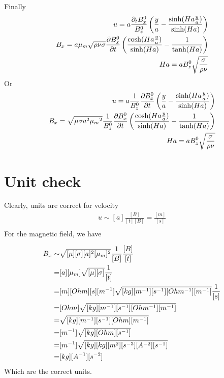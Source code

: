 \documentclass[11pt]{article}
\begin{document}
Finally
\begin{equation}\begin{aligned}
u   = a \frac{\partial_t B_x^0}{ B_z^0} \left( \frac{y}{a} - \frac{\sinh(Ha \frac{y}{a})}{\sinh(Ha)} \right) \\
B_x = a {\mu_m} \sqrt{\rho \nu \sigma}  \frac{\partial B_x^0}{\partial t} \left( \frac{\cosh(Ha \frac{y}{a})}{\sinh(Ha)} - \frac{1}{\tanh(Ha)} \right) \\
Ha = a B_z^0 \sqrt{\frac{\sigma}{\rho \nu}} \\
\end{aligned} \end{equation}
Or
\begin{equation}\begin{aligned}
u   = a \frac{1}{B_z^0} \frac{\partial B_x^0}{\partial t}  \left( \frac{y}{a} - \frac{\sinh(Ha \frac{y}{a})}{\sinh(Ha)} \right) \\
B_x = \sqrt{\mu \sigma a^2 {\mu_m}^2} \frac{1}{B_z^0} \frac{\partial B_x^0}{\partial t} \left( \frac{\cosh(Ha \frac{y}{a})}{\sinh(Ha)} - \frac{1}{\tanh(Ha)} \right) \\
Ha = a B_z^0 \sqrt{\frac{\sigma}{\rho \nu}} \\
\end{aligned} \end{equation}

\section{Unit check}
Clearly, units are correct for velocity
\begin{equation}\begin{aligned}
u  \sim [a] \frac{[B]}{[t] [B]} = \frac{[m]}{[s]} \\
\end{aligned} \end{equation}
For the magnetic field, we have

\begin{equation}\begin{aligned}
B_x \sim & \sqrt{[\mu] [\sigma] [a]^2 [{\mu_m}]^2} \frac{1}{[B]} \frac{[B]}{[t]}  \\
       = & [a] [{\mu_m}] \sqrt{[\mu] [\sigma]} \frac{1}{[t]} \\
       = & [m] [Ohm] [s] [m^{-1}] \sqrt{[kg] [m^{-1}] [s^{-1}] [Ohm^{-1}] [m^{-1}]} \frac{1}{[s]} \\
       = & [Ohm] \sqrt{[kg] [m^{-1}] [s^{-1}] [Ohm^{-1}] [m^{-1}]} \\
       = & \sqrt{[kg] [m^{-1}] [s^{-1}] [Ohm] [m^{-1}]} \\
       = & [m^{-1}] \sqrt{[kg] [Ohm] [s^{-1}]} \\
       = & [m^{-1}] \sqrt{[kg] [kg] [m^2] [s^{-3}] [A^{-2}] [s^{-1}]} \\
       = & [kg] [A^{-1}] [s^{-2}] \\
\end{aligned} \end{equation}
Which are the correct units.
\end{document}
